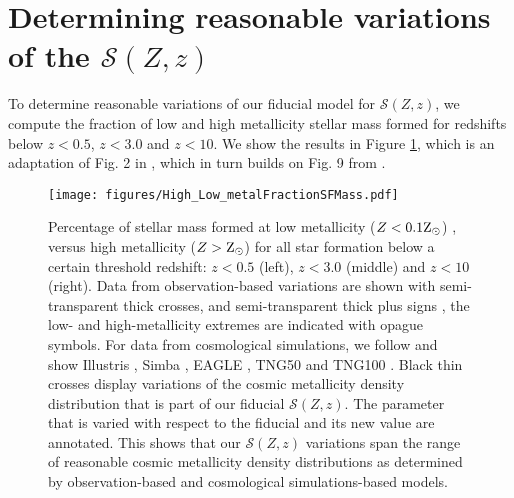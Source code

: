 \documentclass[linenumbers,twocolumn]{aastex631}
\newcommand{\SFRDzZ}{\ensuremath{\mathcal{S}(Z,z)}\xspace}
\begin{document}
\appendix

\section{Determining reasonable variations of the \SFRDzZ \label{app: reasonable var}}
To determine reasonable variations of our fiducial model for \SFRDzZ, we compute the fraction of low and high metallicity stellar mass formed for redshifts below $z<0.5$, $z < 3.0$ and $z<10$. We show the results in Figure \ref{fig: low high Z fraction}, which is an adaptation of Fig. 2 in \cite{Pakmor+2022}, which in turn builds on Fig. 9 from \cite{Chruslinska2019_obs}.

\begin{figure}
\centering
{}
\texttt{[image: figures/High\_Low\_metalFractionSFMass.pdf]}
\caption{Percentage of stellar mass formed at low metallicity ($Z < 0.1 \rm{Z_{\odot}}$) , versus high metallicity ($Z>\rm{Z_{\odot}}$) for all star formation below a certain threshold redshift: $z<0.5$ (left), $z < 3.0$ (middle) and $z<10$ (right). Data from observation-based variations are shown with semi-transparent thick crosses,  \citep[][]{Chruslinska2019_obs} and semi-transparent thick plus signs \citep[][]{Chruslinska+2021}, the low- and high-metallicity extremes are indicated with opague symbols. For data from cosmological simulations, we follow \cite{Pakmor+2022} and show Illustris \citep[][squares]{Vogelsberger+2014}, Simba \citep[][diamonds]{Dave+2019}, EAGLE \citep[][triangles]{Schaye+2015}, TNG50 and TNG100 \citep[][filled and open circles respectively]{FirstResTNG_Springel2018}. Black thin crosses display variations of the cosmic metallicity density distribution that is part of our fiducial \SFRDzZ. The parameter that is varied with respect to the fiducial and its new value are annotated. This shows that our \SFRDzZ variations span the range of reasonable cosmic metallicity density distributions as determined by observation-based and cosmological simulations-based models.
\label{fig: low high Z fraction}
  }
\end{figure}



\end{document}
